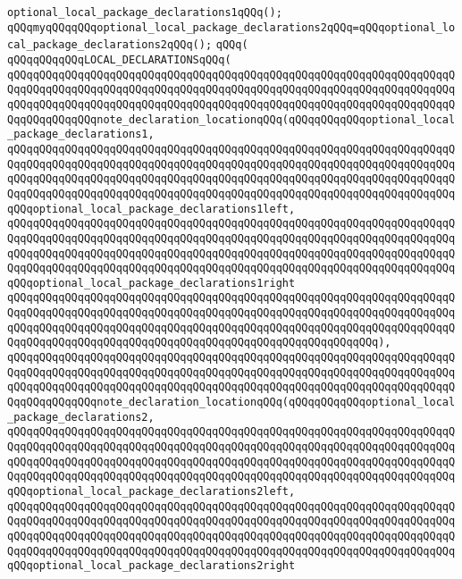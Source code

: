 \verb|optional_local_package_declarations1qQQq();|\newline
\verb|qQQqmyqQQqqQQqoptional_local_package_declarations2qQQq=qQQqoptional_local_package_declarations2qQQq();|\newline
\verb|qQQq(|\newline
\verb|qQQqqQQqqQQqLOCAL_DECLARATIONSqQQq(|\newline
\verb|qQQqqQQqqQQqqQQqqQQqqQQqqQQqqQQqqQQqqQQqqQQqqQQqqQQqqQQqqQQqqQQqqQQqqQQqqQQqqQQqqQQqqQQqqQQqqQQqqQQqqQQqqQQqqQQqqQQqqQQqqQQqqQQqqQQqqQQqqQQqqQQqqQQqqQQqqQQqqQQqqQQqqQQqqQQqqQQqqQQqqQQqqQQqqQQqqQQqqQQqqQQqqQQqqQQqqQQqqQQqqQQqnote_declaration_locationqQQq(qQQqqQQqqQQqoptional_local_package_declarations1,|\newline
\verb|qQQqqQQqqQQqqQQqqQQqqQQqqQQqqQQqqQQqqQQqqQQqqQQqqQQqqQQqqQQqqQQqqQQqqQQqqQQqqQQqqQQqqQQqqQQqqQQqqQQqqQQqqQQqqQQqqQQqqQQqqQQqqQQqqQQqqQQqqQQqqQQqqQQqqQQqqQQqqQQqqQQqqQQqqQQqqQQqqQQqqQQqqQQqqQQqqQQqqQQqqQQqqQQqqQQqqQQqqQQqqQQqqQQqqQQqqQQqqQQqqQQqqQQqqQQqqQQqqQQqqQQqqQQqqQQqqQQqqQQqqQQqoptional_local_package_declarations1left,|\newline
\verb|qQQqqQQqqQQqqQQqqQQqqQQqqQQqqQQqqQQqqQQqqQQqqQQqqQQqqQQqqQQqqQQqqQQqqQQqqQQqqQQqqQQqqQQqqQQqqQQqqQQqqQQqqQQqqQQqqQQqqQQqqQQqqQQqqQQqqQQqqQQqqQQqqQQqqQQqqQQqqQQqqQQqqQQqqQQqqQQqqQQqqQQqqQQqqQQqqQQqqQQqqQQqqQQqqQQqqQQqqQQqqQQqqQQqqQQqqQQqqQQqqQQqqQQqqQQqqQQqqQQqqQQqqQQqqQQqqQQqqQQqqQQqoptional_local_package_declarations1right|\newline
\verb|qQQqqQQqqQQqqQQqqQQqqQQqqQQqqQQqqQQqqQQqqQQqqQQqqQQqqQQqqQQqqQQqqQQqqQQqqQQqqQQqqQQqqQQqqQQqqQQqqQQqqQQqqQQqqQQqqQQqqQQqqQQqqQQqqQQqqQQqqQQqqQQqqQQqqQQqqQQqqQQqqQQqqQQqqQQqqQQqqQQqqQQqqQQqqQQqqQQqqQQqqQQqqQQqqQQqqQQqqQQqqQQqqQQqqQQqqQQqqQQqqQQqqQQqqQQqqQQqqQQqqQQqqQQq),|\newline
\verb|qQQqqQQqqQQqqQQqqQQqqQQqqQQqqQQqqQQqqQQqqQQqqQQqqQQqqQQqqQQqqQQqqQQqqQQqqQQqqQQqqQQqqQQqqQQqqQQqqQQqqQQqqQQqqQQqqQQqqQQqqQQqqQQqqQQqqQQqqQQqqQQqqQQqqQQqqQQqqQQqqQQqqQQqqQQqqQQqqQQqqQQqqQQqqQQqqQQqqQQqqQQqqQQqqQQqqQQqqQQqqQQqnote_declaration_locationqQQq(qQQqqQQqqQQqoptional_local_package_declarations2,|\newline
\verb|qQQqqQQqqQQqqQQqqQQqqQQqqQQqqQQqqQQqqQQqqQQqqQQqqQQqqQQqqQQqqQQqqQQqqQQqqQQqqQQqqQQqqQQqqQQqqQQqqQQqqQQqqQQqqQQqqQQqqQQqqQQqqQQqqQQqqQQqqQQqqQQqqQQqqQQqqQQqqQQqqQQqqQQqqQQqqQQqqQQqqQQqqQQqqQQqqQQqqQQqqQQqqQQqqQQqqQQqqQQqqQQqqQQqqQQqqQQqqQQqqQQqqQQqqQQqqQQqqQQqqQQqqQQqqQQqqQQqqQQqqQQqoptional_local_package_declarations2left,|\newline
\verb|qQQqqQQqqQQqqQQqqQQqqQQqqQQqqQQqqQQqqQQqqQQqqQQqqQQqqQQqqQQqqQQqqQQqqQQqqQQqqQQqqQQqqQQqqQQqqQQqqQQqqQQqqQQqqQQqqQQqqQQqqQQqqQQqqQQqqQQqqQQqqQQqqQQqqQQqqQQqqQQqqQQqqQQqqQQqqQQqqQQqqQQqqQQqqQQqqQQqqQQqqQQqqQQqqQQqqQQqqQQqqQQqqQQqqQQqqQQqqQQqqQQqqQQqqQQqqQQqqQQqqQQqqQQqqQQqqQQqqQQqqQQqoptional_local_package_declarations2right|\newline
